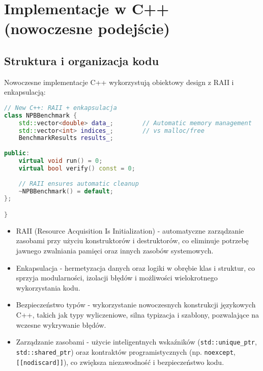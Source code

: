 \section{Implementacje w C++ (nowoczesne podejście)}
\subsection{Struktura i organizacja kodu}
Nowoczesne implementacje C++ wykorzystują obiektowy design z RAII i enkapsulacją:
\begin{lstlisting}[language=C++, style=VS2017,  caption={Implementacja nowoczesnego C++ - struktura kodu}, label={lst:modern-cpp-structure}]
// New C++: RAII + enkapsulacja
class NPBBenchmark {
    std::vector<double> data_;        // Automatic memory management
    std::vector<int> indices_;        // vs malloc/free
    BenchmarkResults results_;
    
public:
    virtual void run() = 0;
    virtual bool verify() const = 0;
    
    // RAII ensures automatic cleanup
    ~NPBBenchmark() = default;
};

}
\end{lstlisting}
\begin{itemize}
    \item RAII (Resource Acquisition Is Initialization) - automatyczne zarządzanie zasobami przy użyciu konstruktorów i destruktorów, co eliminuje potrzebę jawnego zwalniania pamięci oraz innych zasobów systemowych.
    
    \item Enkapsulacja - hermetyzacja danych oraz logiki w obrębie klas i struktur, co sprzyja modularności, izolacji błędów i możliwości wielokrotnego wykorzystania kodu.
    
    \item Bezpieczeństwo typów - wykorzystanie nowoczesnych konstrukcji językowych C++, takich jak typy wyliczeniowe, silna typizacja i szablony, pozwalające na wczesne wykrywanie błędów.
    
    \item Zarządzanie zasobami - użycie inteligentnych wskaźników (\texttt{std::unique\_ptr}, \texttt{std::shared\_ptr}) oraz kontraktów programistycznych (np. \texttt{noexcept}, \texttt{[[nodiscard]]}), co zwiększa niezawodność i bezpieczeństwo kodu.
\end{itemize}

  
